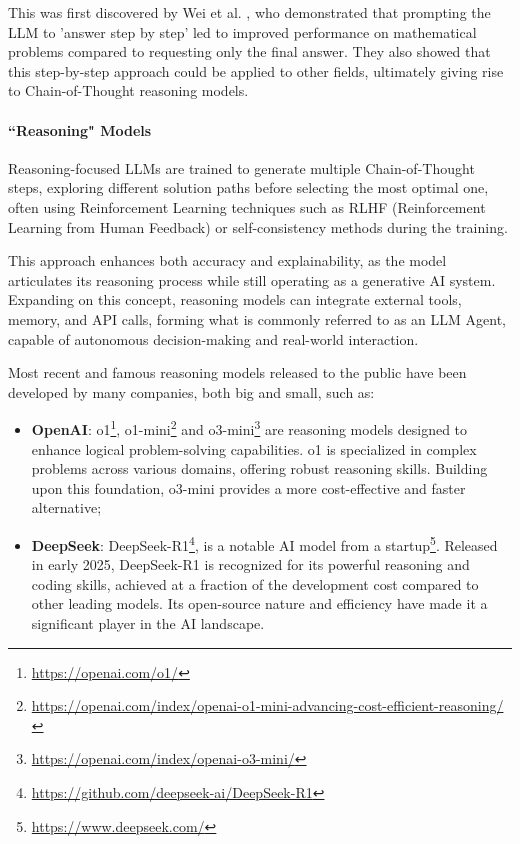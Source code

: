 This was first discovered by Wei et al. \cite{wei2023chainofthoughtpromptingelicitsreasoning},
who demonstrated that prompting the LLM to 'answer step by step' led to improved
performance on mathematical problems compared to requesting only the final
answer. They also showed that this step-by-step approach could be applied to other
fields, ultimately giving rise to Chain-of-Thought reasoning models.

\paragraph{``Reasoning" Models}
Reasoning-focused LLMs are trained to generate multiple Chain-of-Thought steps,
exploring different solution paths before selecting the most optimal one, often using
Reinforcement Learning \cite{deepseekai2025deepseekr1incentivizingreasoningcapability}
techniques such as RLHF (Reinforcement Learning from Human Feedback) or self-consistency
methods during the training.

This approach enhances both accuracy and explainability, as the model
articulates its reasoning process while still operating as a generative AI
system. Expanding on this concept, reasoning models can integrate external tools,
memory, and API calls, forming what is commonly referred to as an LLM Agent,
capable of autonomous decision-making and real-world interaction.

Most recent and famous reasoning models released to the public have been
developed by many companies, both big and small, such as:
\begin{itemize}
  \item \textbf{OpenAI}: o1\footnote{\url{https://openai.com/o1/}}, o1-mini\footnote{\url{https://openai.com/index/openai-o1-mini-advancing-cost-efficient-reasoning/}}
    and o3-mini\footnote{\url{https://openai.com/index/openai-o3-mini/}} are reasoning
    models designed to enhance logical problem-solving capabilities. o1 is
    specialized in complex problems across various domains, offering robust reasoning
    skills. Building upon this foundation, o3-mini provides a more cost-effective
    and faster alternative;

  \item \textbf{DeepSeek}: DeepSeek-R1\footnote{\url{https://github.com/deepseek-ai/DeepSeek-R1}},
    is a notable AI model from a startup\footnote{\url{https://www.deepseek.com/}}.
    Released in early 2025, DeepSeek-R1 is recognized for its powerful reasoning
    and coding skills, achieved at a fraction of the development cost compared to
    other leading models. Its open-source nature and efficiency have made it a
    significant player in the AI landscape.
\end{itemize}

